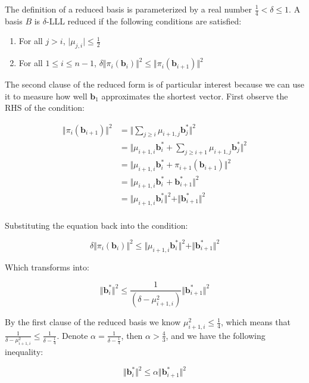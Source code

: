 \documentclass[letterpaper,12pt]{article}
\begin{document}
The definition of a reduced basis is parameterized by a real number $\frac{1}{4} < \delta \leq 1$. A basis $B$ is $\delta$-LLL reduced if the following conditions are satisfied:

\begin{enumerate}
    \item For all $j > i$, $\vert\mu_{j, i}\vert \leq \frac{1}{2}$
    \item For all $1 \leq i \leq n-1$, $\delta\Vert \pi_i(\mathbf{b}_i)\Vert^2 \leq \Vert\pi_i(\mathbf{b}_{i+1})\Vert^2$
\end{enumerate}

The second clause of the reduced form is of particular interest because we can use it to measure how well $\mathbf{b}_1$ approximates the shortest vector. First observe the RHS of the condition:

$$
\begin{aligned}
\Vert \pi_i(\mathbf{b}_{i+1})\Vert^2 &= \Vert \sum_{j\geq i}\mu_{i+1, j}\mathbf{b}_j^\ast\Vert^2 \\
&= \Vert \mu_{i+1, i}\mathbf{b}_i^\ast + \sum_{j\geq i+1}\mu_{i+1, j}\mathbf{b}_j^\ast\Vert^2 \\
&= \Vert \mu_{i+1, i}\mathbf{b}_i^\ast + \pi_{i+1}(\mathbf{b}_{i+1}) \Vert^2 \\
&= \Vert \mu_{i+1, i}\mathbf{b}_i^\ast + \mathbf{b}_{i+1}^\ast \Vert^2 \\
&= \Vert \mu_{i+1, i}\mathbf{b}_i^\ast \Vert^2 + \Vert \mathbf{b}_{i+1}^\ast \Vert^2 \\
\end{aligned}
$$

Substituting the equation back into the condition:

$$
\delta\Vert \pi_i(\mathbf{b}_i)\Vert^2 \leq \Vert \mu_{i+1, i}\mathbf{b}_i^\ast \Vert^2 + \Vert \mathbf{b}_{i+1}^\ast \Vert^2
$$

Which transforms into:

$$
\Vert \mathbf{b}_i^\ast \Vert^2 \leq \frac{1}{(\delta - \mu_{i+1, i}^2)} \Vert \mathbf{b}_{i+1}^\ast \Vert^2
$$

By the first clause of the reduced basis we know $\mu_{i+1, i}^2 \leq \frac{1}{4}$, which means that $\frac{1}{\delta - \mu_{i+1, i}^2} \leq \frac{1}{\delta - \frac{1}{4}}$. Denote $\alpha = \frac{1}{\delta - \frac{1}{4}}$, then $\alpha > \frac{4}{3}$, and we have the following inequality:

$$
\Vert \mathbf{b}_i^\ast \Vert^2 \leq \alpha \Vert \mathbf{b}_{i+1}^\ast \Vert^2
$$
\end{document}
